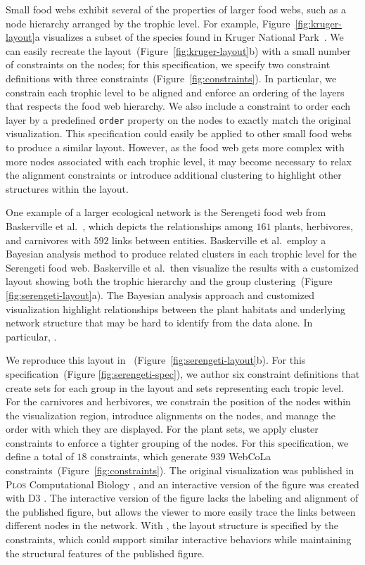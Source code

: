 Small food webs exhibit several of the properties of larger food webs, such
as a node hierarchy arranged by the trophic level.
For example, Figure~\ref{fig:kruger-layout}a visualizes a subset of the
species found in Kruger National Park~\cite{kruger2017}. We can easily 
recreate the layout~(Figure~\ref{fig:kruger-layout}b) with a small 
number of constraints on the nodes; for this specification, we specify 
two constraint definitions with three constraints~(Figure~\ref{fig:constraints}).
In particular, we constrain each trophic level to be aligned and enforce an
ordering of the layers that respects the food web hierarchy. We also
include a constraint to order each layer by a predefined \texttt{order} property
on the nodes to exactly match the original visualization. This \projectname specification 
could easily be applied to other small food webs to produce a similar layout.
However, as the food web gets more complex with more nodes associated with
each trophic level, it may become necessary to relax the alignment
constraints or introduce additional clustering to highlight other
structures within the layout.

One example of a larger ecological network is the Serengeti food web from
Baskerville et al.~\cite{baskerville2011spatial}, which depicts the
relationships among $161$ plants, herbivores, and carnivores with $592$ links
between entities. Baskerville et al.\ employ a Bayesian analysis method to
produce related clusters in each trophic level for the Serengeti food web.
Baskerville et al.\ then visualize the results with a
customized layout showing both the trophic hierarchy and
the group clustering~(Figure \ref{fig:serengeti-layout}a). The Bayesian
analysis approach and customized visualization highlight relationships between
the plant habitats and underlying network structure that may be hard to identify
from the data alone. In particular, .

We reproduce this layout in \projectname~(Figure~\ref{fig:serengeti-layout}b).
For this specification~(Figure \ref{fig:serengeti-spec}), we author six constraint 
definitions that create sets for each group in the layout and sets 
representing each tropic level. For the carnivores and herbivores,
we constrain the position of the nodes within the visualization region,
introduce alignments on the nodes, and manage the order with which they
are displayed. For the plant sets, we apply cluster constraints
to enforce a tighter grouping of the nodes. For this specification,
we define a total of $18$ \projectname constraints, which generate $939$
WebCoLa constraints~(Figure~\ref{fig:constraints}).
The original visualization was published in \textsc{Plos} Computational
Biology \cite{baskerville2011spatial}, and an interactive version of the
figure was created with D3 \cite{baskerville2011interactive}. The
interactive version of the figure lacks the labeling and alignment of the
published figure, but allows the viewer to more easily trace the links
between different nodes in the network. With \projectname, the layout
structure is specified by the constraints, which could support similar
interactive behaviors while maintaining the structural features of the
published figure.

